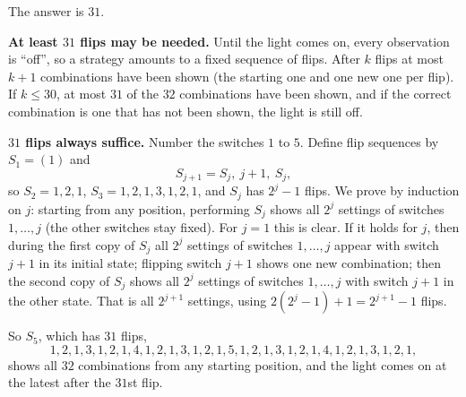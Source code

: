The answer is $\boxed{31}$.

\textbf{At least $31$ flips may be needed.} Until the light comes on, every observation is ``off'', so a strategy amounts to a fixed sequence of flips. After $k$ flips at most $k+1$ combinations have been shown (the starting one and one new one per flip). If $k\le30$, at most $31$ of the $32$ combinations have been shown, and if the correct combination is one that has not been shown, the light is still off.

\textbf{$31$ flips always suffice.} Number the switches $1$ to $5$. Define flip sequences by $S_1=(1)$ and
\[S_{j+1}=S_j,\ j+1,\ S_j,\]
so $S_2=1,2,1$, $S_3=1,2,1,3,1,2,1$, and $S_j$ has $2^j-1$ flips. We prove by induction on $j$: starting from any position, performing $S_j$ shows all $2^j$ settings of switches $1,\dots,j$ (the other switches stay fixed). For $j=1$ this is clear. If it holds for $j$, then during the first copy of $S_j$ all $2^j$ settings of switches $1,\dots,j$ appear with switch $j+1$ in its initial state; flipping switch $j+1$ shows one new combination; then the second copy of $S_j$ shows all $2^j$ settings of switches $1,\dots,j$ with switch $j+1$ in the other state. That is all $2^{j+1}$ settings, using $2(2^j-1)+1=2^{j+1}-1$ flips.

So $S_5$, which has $31$ flips,
\[1,2,1,3,1,2,1,4,1,2,1,3,1,2,1,5,1,2,1,3,1,2,1,4,1,2,1,3,1,2,1,\]
shows all $32$ combinations from any starting position, and the light comes on at the latest after the $31$st flip.
